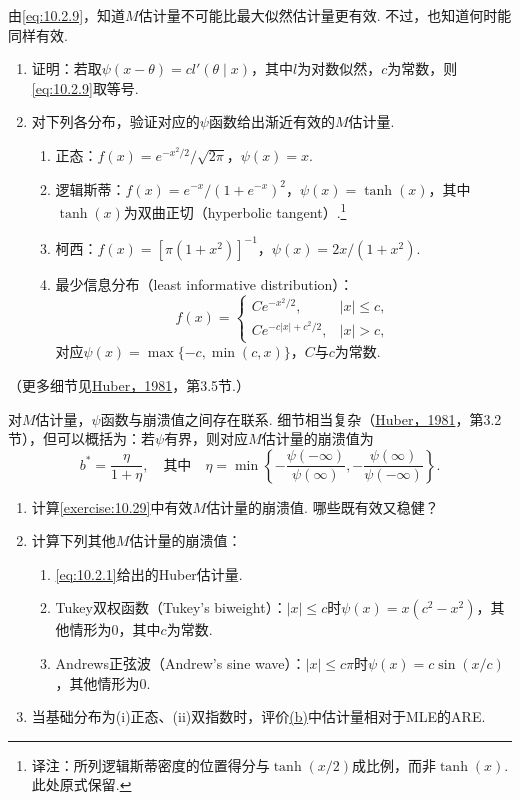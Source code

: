\begin{exercise}\label{exercise:10.29}
由\eqref{eq:10.2.9}，知道$M$估计量不可能比最大似然估计量更有效. 不过，也知道何时能同样有效.
\begin{enumerate}[label=(\alph*)]
\item 证明：若取$\psi(x-\theta)=cl'(\theta\mid x)$，其中$l$为对数似然，$c$为常数，则\eqref{eq:10.2.9}取等号.
\item 对下列各分布，验证对应的$\psi$函数给出渐近有效的$M$估计量.
\begin{enumerate}[label=(\roman*)]
\item 正态：$f(x)=e^{-x^2/2}/\sqrt{2\pi}$，$\psi(x)=x$.
\item 逻辑斯蒂：$f(x)=e^{-x}/(1+e^{-x})^2$，$\psi(x)=\tanh(x)$，其中$\tanh(x)$为双曲正切（hyperbolic tangent）.\footnote{译注：所列逻辑斯蒂密度的位置得分与$\tanh(x/2)$成比例，而非$\tanh(x)$. 此处原式保留.}
\item 柯西：$f(x)=[\pi(1+x^2)]^{-1}$，$\psi(x)=2x/(1+x^2)$.
\item 最少信息分布（least informative distribution）：
$$f(x)=\begin{cases}Ce^{-x^2/2},&|x|\leq c,\\Ce^{-c|x|+c^2/2},&|x|>c,\end{cases}$$
对应$\psi(x)=\max\{-c,\min(c,x)\}$，$C$与$c$为常数.
\end{enumerate}
\end{enumerate}
（更多细节见\hyperref[bib:source171]{Huber，1981}，第3.5节.）
\end{exercise}

\begin{exercise}\label{exercise:10.30}
对$M$估计量，$\psi$函数与崩溃值之间存在联系. 细节相当复杂（\hyperref[bib:source171]{Huber，1981}，第3.2节），但可以概括为：若$\psi$有界，则对应$M$估计量的崩溃值为
$$b^*=\frac\eta{1+\eta},\quad\text{其中}\quad\eta=\min\left\{-\frac{\psi(-\infty)}{\psi(\infty)},-\frac{\psi(\infty)}{\psi(-\infty)}\right\}.$$
\begin{enumerate}[label=(\alph*)]
\item 计算\autoref{exercise:10.29}中有效$M$估计量的崩溃值. 哪些既有效又稳健？
\item\label{item:10.30.b} 计算下列其他$M$估计量的崩溃值：
\begin{enumerate}[label=(\roman*)]
\item \eqref{eq:10.2.1}给出的Huber估计量.
\item Tukey双权函数（Tukey's biweight）：$|x|\leq c$时$\psi(x)=x(c^2-x^2)$，其他情形为0，其中$c$为常数.
\item Andrews正弦波（Andrew's sine wave）：$|x|\leq c\pi$时$\psi(x)=c\sin(x/c)$，其他情形为0.
\end{enumerate}
\item 当基础分布为(i)正态、(ii)双指数时，评价\hyperref[item:10.30.b]{(b)}中估计量相对于MLE的ARE.
\end{enumerate}
\end{exercise}

